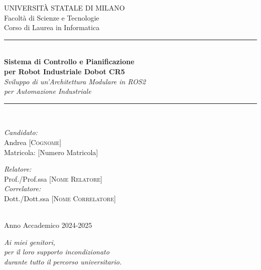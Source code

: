 \documentclass[12pt,a4paper,twoside,openright]{book}
\newcommand{\HRule}{\rule{\linewidth}{0.5mm}}
\begin{document}
\begin{titlepage}
\centering


{\Large UNIVERSITÀ STATALE DI MILANO}\\[0.5cm]
{\large Facoltà di Scienze e Tecnologie}\\[0.5cm]
{\large Corso di Laurea in Informatica}\\[2cm]

\HRule \\[0.4cm]
{\huge \bfseries Sistema di Controllo e Pianificazione \\[0.2cm] per Robot Industriale Dobot CR5}\\[0.2cm]
{\Large \textit{Sviluppo di un'Architettura Modulare in ROS2 \\per Automazione Industriale}}\\[0.4cm]
\HRule \\[2cm]

\begin{minipage}{0.4\textwidth}
\begin{flushleft} \large
\emph{Candidato:}\\
Andrea \textsc{[Cognome]}\\
Matricola: [Numero Matricola]
\end{flushleft}
\end{minipage}%
\begin{minipage}{0.4\textwidth}
\begin{flushright} \large
\emph{Relatore:} \\
Prof./Prof.ssa \textsc{[Nome Relatore]}\\[0.5cm]
\emph{Correlatore:} \\
Dott./Dott.ssa \textsc{[Nome Correlatore]}
\end{flushright}
\end{minipage}\\[3cm]

{\large Anno Accademico 2024-2025}

\end{titlepage}

\cleardoublepage

\thispagestyle{empty}
\null\vfill
\begin{center}
\textit{Ai miei genitori, \\
per il loro supporto incondizionato \\
durante tutto il percorso universitario.}
\end{center}
\vfill\null
\cleardoublepage
\end{document}
